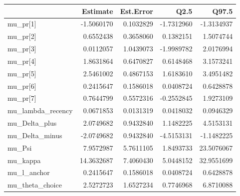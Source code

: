 
\begin{tabular}{lrrrr}
\toprule
  & Estimate & Est.Error & Q2.5 & Q97.5\\
\midrule
mu\_pr[1] & -1.5060170 & 0.1032829 & -1.7312960 & -1.3134937\\
mu\_pr[2] & 0.6552438 & 0.3658060 & 0.1382151 & 1.5074744\\
mu\_pr[3] & 0.0112057 & 1.0439073 & -1.9989782 & 2.0176994\\
mu\_pr[4] & 1.8631864 & 0.6470827 & 0.6148468 & 3.1573241\\
mu\_pr[5] & 2.5461002 & 0.4867153 & 1.6183610 & 3.4951482\\
\addlinespace
mu\_pr[6] & 0.2415647 & 0.1586018 & 0.0408724 & 0.6428878\\
mu\_pr[7] & 0.7644799 & 0.5572316 & -0.2552845 & 1.9273109\\
mu\_lambda\_recency & 0.0671853 & 0.0131319 & 0.0418032 & 0.0946329\\
mu\_Delta\_plus & 2.0749682 & 0.9432840 & 1.1482225 & 4.5153131\\
mu\_Delta\_minus & -2.0749682 & 0.9432840 & -4.5153131 & -1.1482225\\
\addlinespace
mu\_Psi & 7.9572987 & 5.7611105 & 1.8493733 & 23.5076067\\
mu\_kappa & 14.3632687 & 7.4060430 & 5.0448152 & 32.9551699\\
mu\_l\_anchor & 0.2415647 & 0.1586018 & 0.0408724 & 0.6428878\\
mu\_theta\_choice & 2.5272723 & 1.6527234 & 0.7746968 & 6.8710088\\
\bottomrule
\end{tabular}
